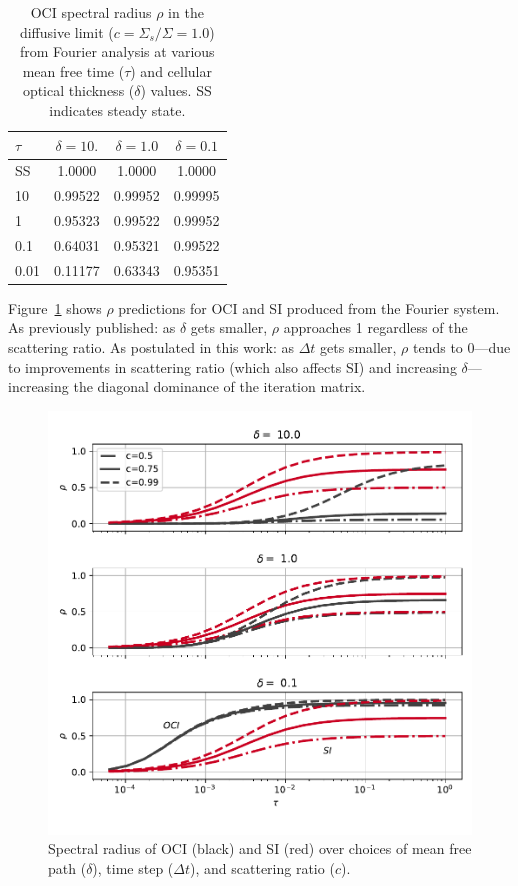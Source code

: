 \begin{table}
  \centering
  \begin{tabular}{@{}l c c c @{}} \toprule
    $\tau$ & $\delta=10.$ & $\delta=1.0$ & $\delta=0.1$ \\ \midrule
    SS  & \num{1.0000} & \num{1.0000} & \num{1.0000} \\
    10 & \num{0.99522} & \num{0.99952} & \num{0.99995} \\
    1  & \num{0.95323} & \num{0.99522} & \num{0.99952} \\
    0.1   & \num{0.64031} & \num{0.95321} & \num{0.99522} \\
    0.01 & \num{0.11177} & \num{0.63343} & \num{0.95351} \\
    \bottomrule
  \end{tabular}
  \caption{OCI spectral radius $\rho$ in the diffusive limit ($c=\Sigma_s/\Sigma =1.0$) from Fourier analysis at various mean free time ($\tau$) and cellular optical thickness ($\delta$) values. SS indicates steady state.} 
  \label{table:difflimit} 
\end{table}

Figure~\ref{fig:specrad_fa} shows $\rho$ predictions for OCI and SI produced from the Fourier system.
As previously published: as $\delta$ gets smaller, $\rho$ approaches 1 regardless of the scattering ratio.
As postulated in this work: as $\Delta t$ gets smaller, $\rho$ tends to 0---due to improvements in scattering ratio (which also affects SI) and increasing $\delta$---increasing the diagonal dominance of the iteration matrix.

\begin{figure}
    \centering
    \includegraphics[width=\textwidth]{deterministic/therefore_paper/therefore_figs/spec_rad_over_dt.pdf}
    \caption{Spectral radius of OCI (black) and SI (red) over choices of mean free path ($\delta$), time step ($\Delta t$), and scattering ratio ($c$).}
    \label{fig:specrad_fa}
\end{figure}

